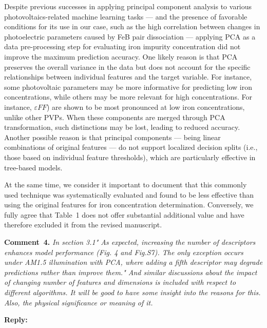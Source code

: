 \documentclass[a4paper,fleqn]{cas-sc}
\begin{document}
Despite previous successes in applying principal component analysis to various photovoltaics-related machine learning tasks ---
and the presence of favorable conditions for its use in our case,
such as the high correlation between changes in photoelectric parameters caused by FeB pair dissociation ---
applying PCA as a data pre-processing step for evaluating iron impurity concentration did not improve the maximum prediction accuracy.
One likely reason is that PCA preserves the overall variance in the data
but does not account for the specific relationships between individual features and the target variable.
For instance, some photovoltaic parameters may be more informative for predicting low iron concentrations,
while others may be more relevant for high concentrations.
For instance, $\varepsilon F\!F$) are shown \cite{Olikh2025MSEB} to be most pronounced at low iron concentrations, unlike other PVPs.
When these components are merged through PCA transformation, such distinctions may be lost, leading to reduced accuracy.
Another possible reason is that principal components ---
being linear combinations of original features --- do not support localized decision splits
(i.e., those based on individual feature thresholds), which are particularly effective in tree-based models.

At the same time, we consider it important to document that this commonly used technique was systematically evaluated 
and found to be less effective than using the original features for iron concentration determination. 
Conversely, we fully agree that Table~1 does not offer substantial additional value and have therefore excluded it from the revised manuscript.




\vspace{1cm}
\noindent
\textcolor[rgb]{0.00,0.50,1.00}{\textbf{Comment~4.}}
\emph{In section 3.1" As expected, increasing the number of descriptors enhances model performance (Fig. 4 and Fig.S7). The only exception occurs under AM1.5 illumination with PCA, where adding a fifth descriptor may degrade predictions rather than improve them." And similar discussions about the impact of changing number of features and dimensions is included with respect to different algorithms.  It will be good to have some insight into the reasons for this. Also, the physical significance or meaning of it.}

\noindent
\textcolor[rgb]{0.51,0.00,0.00}{\textbf{Reply:}}
\end{document}
